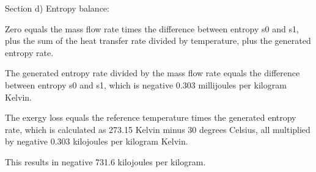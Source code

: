 Section d) Entropy balance:

Zero equals the mass flow rate times the difference between entropy s0 and s1, plus the sum of the heat transfer rate divided by temperature, plus the generated entropy rate.

The generated entropy rate divided by the mass flow rate equals the difference between entropy s0 and s1, which is negative 0.303 millijoules per kilogram Kelvin.

The exergy loss equals the reference temperature times the generated entropy rate, which is calculated as 273.15 Kelvin minus 30 degrees Celsius, all multiplied by negative 0.303 kilojoules per kilogram Kelvin.

This results in negative 731.6 kilojoules per kilogram.